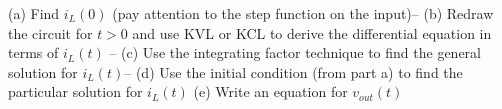 \documentclass{handout}
\theoremstyle{definition}
\begin{document}
(a) Find $i_L(0)$ (pay attention to the step function on the input)--
(b) Redraw the circuit for $t>0$ and use KVL or KCL to derive the differential equation in terms of $i_L(t)$ --
(c) Use the integrating factor technique to find the general solution for $i_L(t)$--
(d) Use the initial condition (from part a) to find the particular solution for  $i_L(t)$
(e) Write an equation for $v_{out}(t)$


\newpage
\clearpage
\pagebreak

\end{document}
